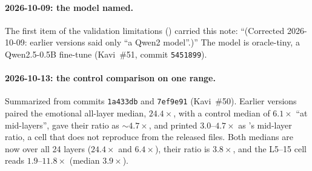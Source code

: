 \documentclass[11pt,a4paper]{article}
\begin{document}
\paragraph{2026-10-09: the model named.}
The first item of the validation limitations () carried
this note: ``(Corrected 2026-10-09: earlier versions said only
``a Qwen2 model''.)'' The model is oracle-tiny, a Qwen2.5-0.5B fine-tune
(Kavi~\#51, commit \texttt{5451899}).

\paragraph{2026-10-13: the control comparison on one range.}
Summarized from commits \texttt{1a433db} and \texttt{7ef9e91} (Kavi~\#50).
Earlier versions paired the emotional all-layer median, $24.4\times$, with
a control median of $6.1\times$ ``at mid-layers'', gave their ratio as
${\sim}4.7\times$, and printed $3.0$--$4.7\times$ as 's
mid-layer ratio, a cell that does not reproduce from the released files.
Both medians are now over all 24 layers ($24.4\times$ and $6.4\times$),
their ratio is $3.8\times$, and the L5--15 cell reads
$1.9$--$11.8\times$ (median $3.9\times$).
\end{document}
